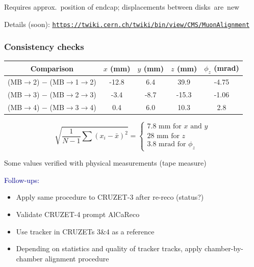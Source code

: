 \documentclass[compress]{beamer}
\begin{document}
\begin{frame}
\begin{columns}
\end{columns}

\vspace{0.4 cm}
Requires approx.\ position of endcap; displacements between \mbox{disks are new\hspace{-1 cm}}

\vspace{0.2 cm}
Details (soon): \textcolor{blue}{\tt \scriptsize \underline{\href{https://twiki.cern.ch/twiki/bin/view/CMS/MuonAlignment}{https://twiki.cern.ch/twiki/bin/view/CMS/MuonAlignment}}}

\end{frame}

\begin{frame}
\frametitle{Consistency checks}
\small

\begin{center}
\begin{tabular}{c | c c c c}
\scriptsize Comparison & \scriptsize $x$ (mm) & \scriptsize $y$ (mm) & \scriptsize $z$ (mm) & \scriptsize $\phi_z$ (mrad) \\\hline
\scriptsize (MB$\to$2) $-$ (MB$\to$1$\to$2) & \scriptsize -12.8 & \scriptsize 6.4 & \scriptsize 39.9 & \scriptsize -4.75 \\
\scriptsize (MB$\to$3) $-$ (MB$\to$2$\to$3) & \scriptsize -3.4 & \scriptsize -8.7 & \scriptsize -15.3 & \scriptsize -1.06 \\
\scriptsize (MB$\to$4) $-$ (MB$\to$3$\to$4) & \scriptsize 0.4 & \scriptsize 6.0 & \scriptsize 10.3 & \scriptsize 2.8 \\\hline
\end{tabular}
\end{center}

\vspace{0.1 cm}
\[ \sqrt{\frac{1}{N-1} \sum (x_i - \bar{x})^2} = \left\{\begin{array}{l} \mbox{7.8~mm for $x$ and $y$} \\ \mbox{28~mm for $z$} \\ \mbox{3.8~mrad for $\phi_z$} \end{array}\right. \]

\vspace{0.1 cm}
Some values verified with physical measurements (tape measure)

\vspace{0.3 cm}
\hspace{-0.83 cm} \textcolor{darkblue}{\Large Follow-ups:}

\begin{itemize}\setlength{\itemsep}{0.1 cm}
\item Apply same procedure to CRUZET-3 after re-reco (status?)
\item Validate CRUZET-4 prompt AlCaReco
\item Use tracker in CRUZETs 3\&4 as a reference
\item Depending on statistics and quality of tracker tracks, apply
  chamber-by-chamber alignment procedure
\end{itemize}
\end{frame}
\end{document}
